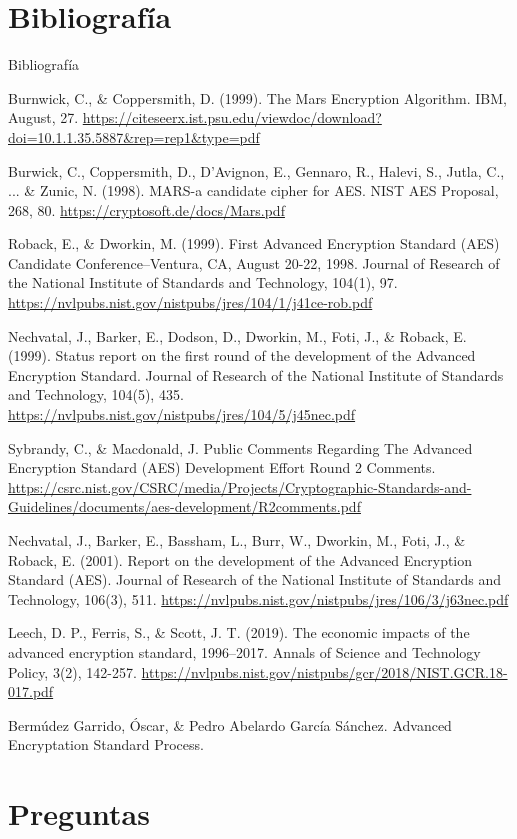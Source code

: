 \documentclass{beamer}
\begin{document}
\section{Bibliografía}
\begin{frame}[allowframebreaks]{Bibliografía}

\scriptsize
\begin{thebibliography}{9}


	Burnwick, C., \& Coppersmith, D. (1999). The Mars Encryption Algorithm. IBM, August, 27. \url{https://citeseerx.ist.psu.edu/viewdoc/download?doi=10.1.1.35.5887&rep=rep1&type=pdf}


	Burwick, C., Coppersmith, D., D’Avignon, E., Gennaro, R., Halevi, S., Jutla, C., ... \& Zunic, N. (1998). MARS-a candidate cipher for AES. NIST AES Proposal, 268, 80. \url{https://cryptosoft.de/docs/Mars.pdf}


	Roback, E., \& Dworkin, M. (1999). First Advanced Encryption Standard (AES) Candidate Conference--Ventura, CA, August 20-22, 1998. Journal of Research of the National Institute of Standards and Technology, 104(1), 97. \url{https://nvlpubs.nist.gov/nistpubs/jres/104/1/j41ce-rob.pdf}


	Nechvatal, J., Barker, E., Dodson, D., Dworkin, M., Foti, J., \& Roback, E. (1999). Status report on the first round of the development of the Advanced Encryption Standard. Journal of Research of the National Institute of Standards and Technology, 104(5), 435. \url{https://nvlpubs.nist.gov/nistpubs/jres/104/5/j45nec.pdf}

	Sybrandy, C., \& Macdonald, J. Public Comments Regarding The Advanced Encryption Standard (AES) Development Effort Round 2 Comments.	\url{https://csrc.nist.gov/CSRC/media/Projects/Cryptographic-Standards-and-Guidelines/documents/aes-development/R2comments.pdf}


	Nechvatal, J., Barker, E., Bassham, L., Burr, W., Dworkin, M., Foti, J., \& Roback, E. (2001). Report on the development of the Advanced Encryption Standard (AES). Journal of Research of the National Institute of Standards and Technology, 106(3), 511. \url{https://nvlpubs.nist.gov/nistpubs/jres/106/3/j63nec.pdf}


	Leech, D. P., Ferris, S., \& Scott, J. T. (2019). The economic impacts of the advanced encryption standard, 1996–2017. Annals of Science and Technology Policy, 3(2), 142-257. \url{https://nvlpubs.nist.gov/nistpubs/gcr/2018/NIST.GCR.18-017.pdf}



	Bermúdez Garrido, Óscar, \& Pedro Abelardo García Sánchez. Advanced Encryptation Standard Process.

\end{thebibliography}


\end{frame}

\section{Preguntas}
\end{document}
